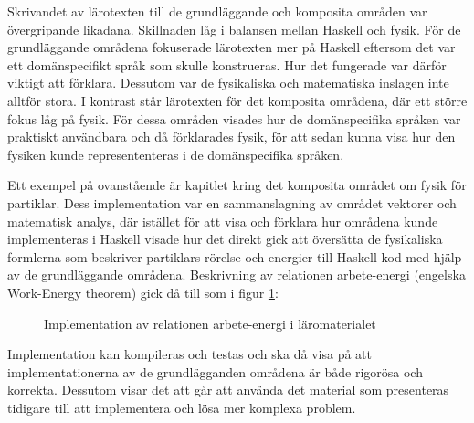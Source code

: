 \begin{draft}
Skrivandet av lärotexten till de grundläggande och komposita områden var
övergripande likadana. Skillnaden låg i balansen mellan Haskell och fysik. För
de grundläggande områdena fokuserade lärotexten mer på Haskell eftersom det var
ett domänspecifikt språk som skulle konstrueras. Hur det fungerade var därför
viktigt att förklara. Dessutom var de fysikaliska och matematiska inslagen inte
alltför stora. I kontrast står lärotexten för det komposita områdena, där ett
större fokus låg på fysik. För dessa områden visades hur de domänspecifika
språken var praktiskt användbara och då förklarades fysik, för att sedan kunna
visa hur den fysiken kunde represententeras i de domänspecifika språken.

Ett exempel på ovanstående är kapitlet kring det komposita området om fysik för
partiklar. Dess implementation var en sammanslagning av området vektorer och
matematisk analys, där istället för att visa och förklara hur områdena kunde
implementeras i Haskell visade hur det direkt gick att översätta de
fysikaliska formlerna som beskriver partiklars rörelse och energier till
Haskell-kod med hjälp av de grundläggande områdena. Beskrivning av relationen arbete-energi (engelska Work-Energy theorem) gick då till som i figur \ref{fig:komposit-ex}:

\begin{figure}[tph]
  \centering
  \caption{Implementation av relationen arbete-energi i läromaterialet}
  \label{fig:komposit-ex}
\end{figure}

Implementation kan kompileras och testas och ska då visa på att
implementationerna av de grundlägganden områdena är både rigorösa och korrekta.
Dessutom visar det att går att använda det material som presenteras tidigare
till  att implementera och lösa mer komplexa problem.

\end{draft}
